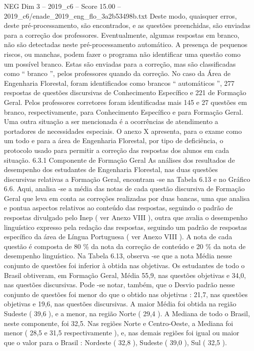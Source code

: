 \begin{textsample}{NEG Dim 3 – 2019\_c6 – Score 15.00 – 2019\_c6/enade\_2019\_eng\_flo\_3a2b53498b.txt}
Deste modo, quaisquer erros, deste pré-processamento, são encontrados, e as questões preenchidas, são enviadas para a correção dos professores.
Eventualmente, algumas respostas em branco, não são detectadas neste pré-processamento automático.
A presença de pequenos riscos, ou manchas, podem fazer o programa não identificar uma questão como um possível branco.
Estas são enviadas para a correção, mas são classificadas como “ branco ”, pelos professores quando da correção.
No caso da Área de Engenharia Florestal, foram identificados como brancos “ automáticos ”, 277 respostas de questões discursivas de Conhecimento Específico e 221 de Formação Geral.
Pelos professores corretores foram identificadas mais 145 e 27 questões em branco, respectivamente, para Conhecimento Específico e para Formação Geral.
Uma outra situação a ser mencionada é a ocorrências de atendimento a portadores de necessidades especiais.
O anexo X apresenta, para o exame como um todo e para a área de Engenharia Florestal, por tipo de deficiência, o protocolo usado para permitir a correção das respostas dos alunos em cada situação. 6.3.1 Componente de Formação Geral As análises dos resultados de desempenho dos estudantes de Engenharia Florestal, nas duas questões discursivas relativas a Formação Geral, encontram -se na Tabela 6.13 e no Gráfico 6.6.
Aqui, analisa -se a média das notas de cada questão discursiva de Formação Geral que leva em conta as correções realizadas por duas bancas, uma que analisa e pontua aspectos relativos ao conteúdo das respostas, seguindo o padrão de respostas divulgado pelo Inep ( ver Anexo VIII ), outra que avalia o desempenho linguístico expresso pela redação das respostas, seguindo um padrão de respostas específico da área de Língua Portuguesa ( ver Anexo VIII ).
A nota de cada questão é composta de 80 \% da nota da correção de conteúdo e 20 \% da nota de desempenho linguístico.
Na Tabela 6.13, observa -se que a nota Média nesse conjunto de questões foi inferior à obtida nas objetivas.
Os estudantes de todo o Brasil obtiveram, em Formação Geral, Média 55,9, nas questões objetivas e 34,0, nas questões discursivas.
Pode -se notar, também, que o Desvio padrão nesse conjunto de questões foi menor do que o obtido nas objetivas : 21,7, nas questões objetivas e 19,6, nas questões discursivas.
A maior Média foi obtida na região Sudeste ( 39,6 ), e a menor, na região Norte ( 29,4 ).
A Mediana de todo o Brasil, neste componente, foi 32,5.
Nas regiões Norte e Centro-Oeste, a Mediana foi menor ( 28,5 e 31,5 respectivamente ), e, nas demais regiões foi igual ou maior que o valor para o Brasil : Nordeste ( 32,8 ), Sudeste ( 39,0 ), Sul ( 32,5 ).

\end{textsample}
